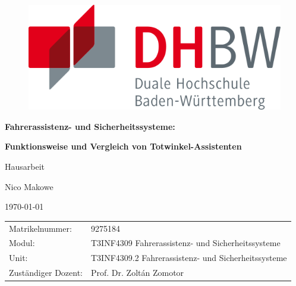 \begin{titlepage}
	\begin{center}
		\begin{figure}
			\includegraphics[width=0.4\linewidth]{images/shared/DHBW-Logo}
			\label{fig:dhbw-logo}
		\end{figure}
		
		\LARGE
		\vspace*{1cm}
		
		\textbf{Fahrerassistenz- und Sicherheitssysteme:}
		
		\vspace{0.5cm}
		
		\textbf{Funktionsweise und Vergleich von Totwinkel-Assistenten}
		
		\vspace{1.5cm}
		\Large
		Hausarbeit
		
		\vspace{1.5cm}
		Nico Makowe
		
		\vspace{1.5cm}
		\dateGerman\today
		
		\vfill
		\large
		\begin{tabular}{l l}
			Matrikelnummer: & 9275184 \\
			Modul: & T3INF4309 Fahrerassistenz- und Sicherheitssysteme \\
			Unit: & T3INF4309.2 Fahrerassistenz- und Sicherheitssysteme \\
			Zuständiger Dozent: & Prof. Dr. Zoltán Zomotor
		\end{tabular}
		
	\end{center}
\end{titlepage}